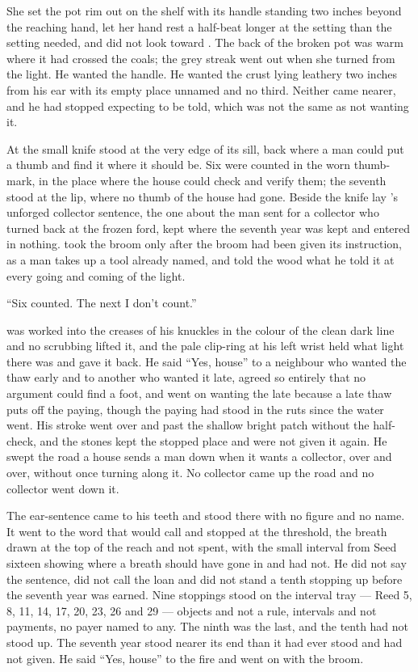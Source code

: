 She set the pot rim out on the shelf with its handle standing two inches beyond the reaching hand, let her hand rest a half-beat longer at the setting than the setting needed, and did not look toward . The back of the broken pot was warm where it had crossed the coals; the grey streak went out when she turned from the light. He wanted the handle. He wanted the crust lying leathery two inches from his ear with its empty place unnamed and no third. Neither came nearer, and he had stopped expecting to be told, which was not the same as not wanting it.

\scenebreak

At  the small knife stood at the very edge of its sill, back where a man could put a thumb and find it where it should be. Six were counted in the worn thumb-mark, in the place where the house could check and verify them; the seventh stood at the lip, where no thumb of the house had gone. Beside the knife lay 's unforged collector sentence, the one about the man sent for a collector who turned back at the frozen ford, kept where the seventh year was kept and entered in nothing.  took the broom only after the broom had been given its instruction, as a man takes up a tool already named, and told the wood what he told it at every going and coming of the light.

“Six counted. The next I don't count.”

 was worked into the creases of his knuckles in the colour of the clean dark line and no scrubbing lifted it, and the pale clip-ring at his left wrist held what light there was and gave it back. He said “Yes, house” to a neighbour who wanted the thaw early and to another who wanted it late, agreed so entirely that no argument could find a foot, and went on wanting the late because a late thaw puts off the paying, though the paying had stood in the ruts since the water went. His stroke went over  and past the shallow bright patch without the half-check, and the stones kept the stopped place and were not given it again. He swept the road a house sends a man down when it wants a collector, over and over, without once turning along it. No collector came up the road and no collector went down it.

The ear-sentence came to his teeth and stood there with no figure and no name. It went to the word that would call  and stopped at the threshold, the breath drawn at the top of the reach and not spent, with the small interval from Seed sixteen showing where a breath should have gone in and had not. He did not say the sentence, did not call the loan and did not stand a tenth stopping up before the seventh year was earned. Nine stoppings stood on the interval tray --- Reed 5, 8, 11, 14, 17, 20, 23, 26 and 29 --- objects and not a rule, intervals and not payments, no payer named to any. The ninth was the last, and the tenth had not stood up. The seventh year stood nearer its end than it had ever stood and had not given. He said “Yes, house” to the fire and went on with the broom.

